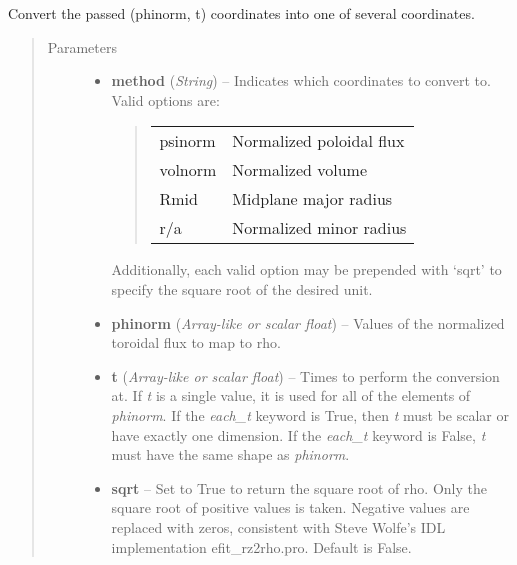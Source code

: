 \documentclass[letterpaper,10pt,english]{sphinxmanual}
\begin{document}
\begin{fulllineitems}
\begin{fulllineitems}
\end{fulllineitems}


\begin{fulllineitems}
\label{eqtools:eqtools.core.Equilibrium.phinorm2rho}
Convert the passed (phinorm, t) coordinates into one of several coordinates.
\begin{quote}\begin{description}
\item[{Parameters}] \leavevmode\begin{itemize}
\item {} 
\textbf{method} (\emph{String}) -- 
Indicates which coordinates to convert to.
Valid options are:
\begin{quote}

\begin{tabulary}{\linewidth}{|L|L|}
\hline

psinorm
 & 
Normalized poloidal flux
\\

volnorm
 & 
Normalized volume
\\

Rmid
 & 
Midplane major radius
\\

r/a
 & 
Normalized minor radius
\\
\hline\end{tabulary}

\end{quote}

Additionally, each valid option may be prepended with `sqrt'
to specify the square root of the desired unit.


\item {} 
\textbf{phinorm} (\emph{Array-like or scalar float}) -- Values of the normalized
toroidal flux to map to rho.

\item {} 
\textbf{t} (\emph{Array-like or scalar float}) -- Times to perform the conversion at.
If \emph{t} is a single value, it is used for all of the elements of
\emph{phinorm}. If the \emph{each\_t} keyword is True, then \emph{t} must be scalar
or have exactly one dimension. If the \emph{each\_t} keyword is False,
\emph{t} must have the same shape as \emph{phinorm}.

\item {} 
\textbf{sqrt} -- Set to True to return the square root of rho. Only
the square root of positive values is taken. Negative values are
replaced with zeros, consistent with Steve Wolfe's IDL
implementation efit\_rz2rho.pro. Default is False.


\end{itemize}
\end{description}
\end{quote}
\end{fulllineitems}
\end{fulllineitems}
\end{document}
